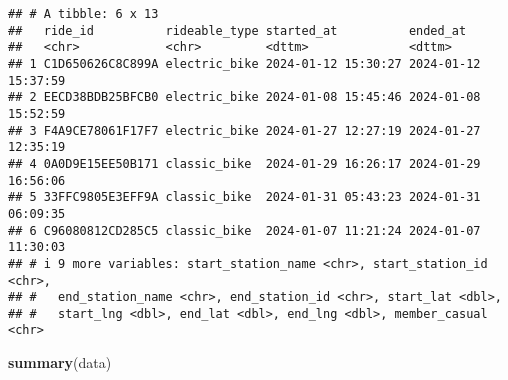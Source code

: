 \documentclass[
]{article}
\newenvironment{Shaded}{\begin{snugshade}}{\end{snugshade}}
\newcommand{\FunctionTok}[1]{\textcolor[rgb]{0.13,0.29,0.53}{\textbf{#1}}}
\newcommand{\NormalTok}[1]{#1}
\begin{document}
\begin{verbatim}
## # A tibble: 6 x 13
##   ride_id          rideable_type started_at          ended_at           
##   <chr>            <chr>         <dttm>              <dttm>             
## 1 C1D650626C8C899A electric_bike 2024-01-12 15:30:27 2024-01-12 15:37:59
## 2 EECD38BDB25BFCB0 electric_bike 2024-01-08 15:45:46 2024-01-08 15:52:59
## 3 F4A9CE78061F17F7 electric_bike 2024-01-27 12:27:19 2024-01-27 12:35:19
## 4 0A0D9E15EE50B171 classic_bike  2024-01-29 16:26:17 2024-01-29 16:56:06
## 5 33FFC9805E3EFF9A classic_bike  2024-01-31 05:43:23 2024-01-31 06:09:35
## 6 C96080812CD285C5 classic_bike  2024-01-07 11:21:24 2024-01-07 11:30:03
## # i 9 more variables: start_station_name <chr>, start_station_id <chr>,
## #   end_station_name <chr>, end_station_id <chr>, start_lat <dbl>,
## #   start_lng <dbl>, end_lat <dbl>, end_lng <dbl>, member_casual <chr>
\end{verbatim}

\begin{Shaded}
\begin{Highlighting}[]
\FunctionTok{summary}\NormalTok{(data)}
\end{Highlighting}
\end{Shaded}
\end{document}
